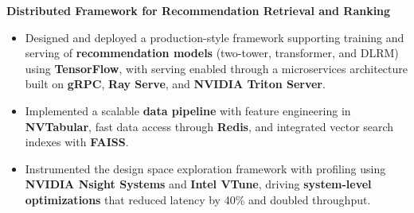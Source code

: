 \documentclass[letterpaper,10pt]{article}
\newcommand{\experienceJobTitleDirectBullets}[4]{
    \textbf{#1} \hfill #3 \\
    #2 \hfill #4 \\
    \vspace{-2pt}
}
\newcommand{\experienceProjectSubtitle}[1]{
    \hspace{0.15in}\textbf{\textbf{#1}}
}
\newcommand{\experienceBulletListStart}{\begin{itemize}[leftmargin=0.3in, label=$\bullet$, topsep=2pt, itemsep=0.2em, parsep=0pt]}
\newcommand{\experienceBulletListEnd}{\end{itemize}\vspace{4pt}}
\begin{document}

\vspace{2pt}
\experienceProjectSubtitle{Distributed Framework for Recommendation Retrieval and Ranking}
\experienceBulletListStart
\item\normalsize{Designed and deployed a production-style framework supporting training and serving of \textbf{recommendation models} (two-tower, transformer, and DLRM) using \textbf{TensorFlow},
with serving enabled through a microservices architecture built on \textbf{gRPC}, \textbf{Ray Serve}, and \textbf{NVIDIA Triton Server}.}
\item\normalsize{Implemented a scalable \textbf{data pipeline} with feature engineering in \textbf{NVTabular}, fast data access through \textbf{Redis}, and integrated vector search indexes with \textbf{FAISS}.}
  \item\normalsize{Instrumented the design space exploration framework with profiling using \textbf{NVIDIA Nsight Systems} and \textbf{Intel VTune}, driving \textbf{system-level optimizations} that reduced latency by 40\% and doubled throughput.}
\experienceBulletListEnd


\end{document}
